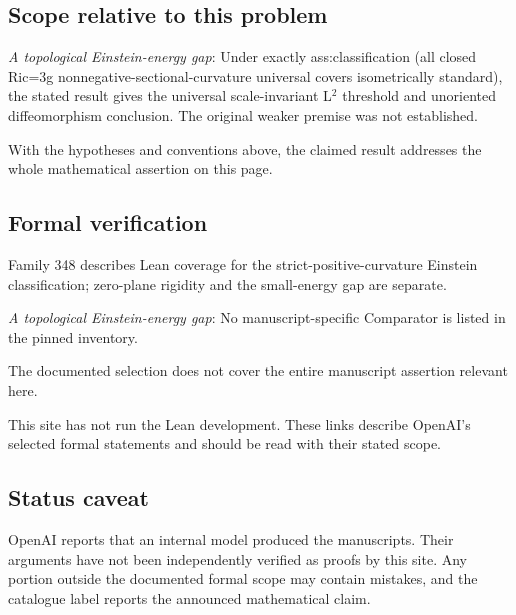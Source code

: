 \documentclass[11pt]{article}
\begin{document}
\subsection{Scope relative to this problem}
\textit{A topological Einstein-energy gap}: Under exactly ass:classification (all closed Ric=3g nonnegative-sectional-curvature universal covers isometrically standard), the stated result gives the universal scale-invariant L\({}^{2}\) threshold and unoriented diffeomorphism conclusion. The original weaker premise was not established.

With the hypotheses and conventions above, the claimed result addresses the whole mathematical assertion on this page.

\subsection{Formal verification}
Family 348 describes Lean coverage for the strict-positive-curvature Einstein classification; zero-plane rigidity and the small-energy gap are separate.

\textit{A topological Einstein-energy gap}: No manuscript-specific Comparator is listed in the pinned inventory.

The documented selection does not cover the entire manuscript assertion relevant here.

This site has not run the Lean development. These links describe OpenAI’s selected formal statements and should be read with their stated scope.

\subsection{Status caveat}
OpenAI reports that an internal model produced the manuscripts. Their arguments have not been independently verified as proofs by this site. Any portion outside the documented formal scope may contain mistakes, and the catalogue label reports the announced mathematical claim.
\end{document}
